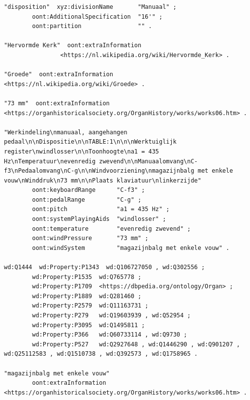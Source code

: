 \begin{lstlisting}[caption={Part14\_000Groede}]
"disposition"  xyz:divisionName       "Manuaal" ;
        oont:AdditionalSpecification  "16'" ;
        oont:partition                "" .

"Hervormde Kerk"  oont:extraInformation
                <https://nl.wikipedia.org/wiki/Hervormde_Kerk> .

"Groede"  oont:extraInformation  <https://nl.wikipedia.org/wiki/Groede> .

"73 mm"  oont:extraInformation  <https://organhistoricalsociety.org/OrganHistory/works/works06.htm> .

"Werkindeling\nmanuaal, aangehangen pedaal\n\nDispositie\n\nTABLE:1\n\n\nWerktuiglijk register\nwindlosser\n\nToonhoogte\na1 = 435 Hz\nTemperatuur\nevenredig zwevend\n\nManuaalomvang\nC-f3\nPedaalomvang\nC-g\n\nWindvoorziening\nmagazijnbalg met enkele vouw\nWinddruk\n73 mm\n\nPlaats klaviatuur\nlinkerzijde"
        oont:keyboardRange      "C-f3" ;
        oont:pedalRange         "C-g" ;
        oont:pitch              "a1 = 435 Hz" ;
        oont:systemPlayingAids  "windlosser" ;
        oont:temperature        "evenredig zwevend" ;
        oont:windPressure       "73 mm" ;
        oont:windSystem         "magazijnbalg met enkele vouw" .

wd:Q1444  wd:Property:P1343  wd:Q106727050 , wd:Q302556 ;
        wd:Property:P1535  wd:Q765778 ;
        wd:Property:P1709  <https://dbpedia.org/ontology/Organ> ;
        wd:Property:P1889  wd:Q281460 ;
        wd:Property:P2579  wd:Q11163731 ;
        wd:Property:P279   wd:Q19603939 , wd:Q52954 ;
        wd:Property:P3095  wd:Q1495811 ;
        wd:Property:P366   wd:Q60733114 , wd:Q9730 ;
        wd:Property:P527   wd:Q2927648 , wd:Q1446290 , wd:Q901207 , wd:Q25112583 , wd:Q1510738 , wd:Q392573 , wd:Q1758965 .

"magazijnbalg met enkele vouw"
        oont:extraInformation  <https://organhistoricalsociety.org/OrganHistory/works/works06.htm> .
\end{lstlisting}

